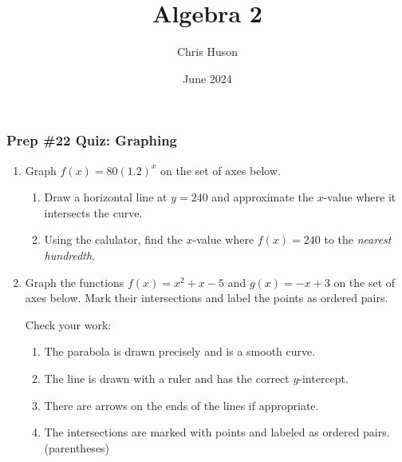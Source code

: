 \documentclass[12pt, twoside]{article}
\title{Algebra 2}
\author{Chris Huson}
\date{June 2024}
\begin{document}
\subsubsection*{Prep \#22 Quiz: Graphing}
\begin{enumerate}[itemsep=0.5cm]
\item Graph $f(x)=80(1.2)^x$ on the set of axes below.
\begin{center}
    \end{center}  \vspace{0.5cm}
    \begin{enumerate}
        \item Draw a horizontal line at $y=240$ and approximate the $x$-value where it intersects the curve. \vspace{1cm}
        \item Using the calulator, find the $x$-value where $f(x)=240$ to the \emph{nearest hundredth}.
    \end{enumerate}

\newpage
\item Graph the functions $f(x) = x^2+x-5$ and $g(x) = -x+3$ on the set of axes below. Mark their intersections and label the points as ordered pairs. \vspace{1cm}
\begin{center}
    \end{center}
    Check your work:
    \begin{enumerate}[label=$\square$]
        \item The parabola is drawn precisely and is a smooth curve. 
        \item The line is drawn with a ruler and has the correct $y$-intercept.
        \item There are arrows on the ends of the lines if appropriate.
        \item The intersections are marked with points and labeled as ordered pairs. (parentheses)
    \end{enumerate}



\end{enumerate}
\end{document}
